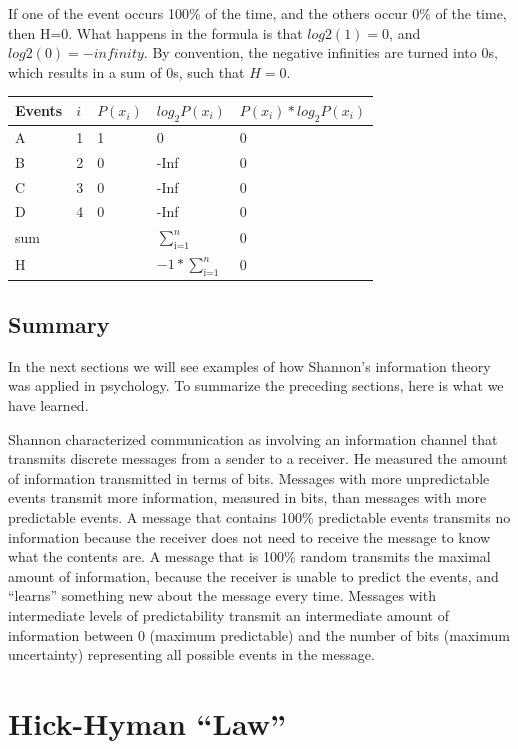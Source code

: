 \documentclass[
  oneside,
  12pt]{crumpbook}
\begin{document}
If one of the event occurs 100\% of the time, and the others occur 0\% of the time, then H=0. What happens in the formula is that \(log2(1) = 0\), and \(log2(0)= -infinity\). By convention, the negative infinities are turned into 0s, which results in a sum of 0s, such that \(H=0\).

\begin{tabular}{l|l|l|l|l}
\hline
Events & $i$ & $P(x_i)$ & $log_2 P(x_i)$ & $P(x_i)*log_2 P(x_i)$\\
\hline
A & 1 & 1 & 0 & 0\\
\hline
B & 2 & 0 & -Inf & 0\\
\hline
C & 3 & 0 & -Inf & 0\\
\hline
D & 4 & 0 & -Inf & 0\\
\hline
sum &  &  & $\sum_\text{i=1}^n$ & 0\\
\hline
H &  &  & $-1*\sum_\text{i=1}^n$ & 0\\
\hline
\end{tabular}

\hypertarget{summary-1}{%
\subsection{Summary}\label{summary-1}}

In the next sections we will see examples of how Shannon's information theory was applied in psychology. To summarize the preceding sections, here is what we have learned.

Shannon characterized communication as involving an information channel that transmits discrete messages from a sender to a receiver. He measured the amount of information transmitted in terms of bits. Messages with more unpredictable events transmit more information, measured in bits, than messages with more predictable events. A message that contains 100\% predictable events transmits no information because the receiver does not need to receive the message to know what the contents are. A message that is 100\% random transmits the maximal amount of information, because the receiver is unable to predict the events, and ``learns'' something new about the message every time. Messages with intermediate levels of predictability transmit an intermediate amount of information between 0 (maximum predictable) and the number of bits (maximum uncertainty) representing all possible events in the message.

\hypertarget{hick-hyman-law}{%
\section{Hick-Hyman ``Law''}\label{hick-hyman-law}}
\end{document}
